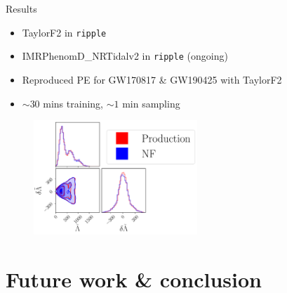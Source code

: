 \documentclass[usenames,dvipsnames,t]{beamer}
\newcommand{\incfig}[2][0.75\textwidth]{%
    \def\svgwidth{\columnwidth}
    \resizebox{#1}{!}{{#2.pdf_tex}}
}
\begin{document}
\begin{frame}{Results}
  \def\x{2mm}
  \def\y{-3mm}


  \begin{itemize}
    \item TaylorF2 in \texttt{ripple}
    
    \vspace{\x}

    \item IMRPhenomD\_NRTidalv2 in \texttt{ripple} (ongoing)
    
    \vspace{\x}
    
    \item Reproduced PE for GW170817 \& GW190425 with TaylorF2
    
    \vspace{\x}

    \item $\sim 30$ mins training, $\sim 1$ min sampling
  \end{itemize}

  \vspace{\y}

  \vspace{8mm}
  \begin{figure}[H]
    \centering
    \includegraphics[width = 0.55\textwidth]{Figures/presentation_GW170817_production_vs_NF.pdf}
  \end{figure}
\end{frame}


\section{Future work \& conclusion}
\end{document}
